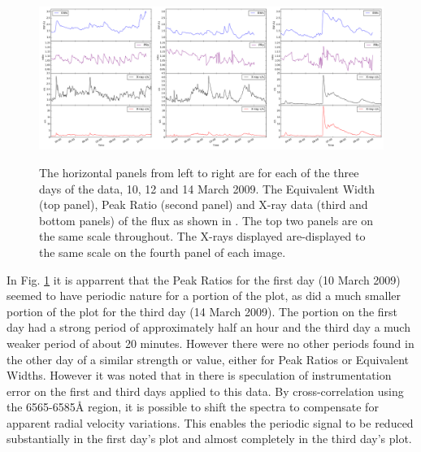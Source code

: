 \begin{figure}[!htbp]
\begin{center}
\includegraphics[scale=0.18]{Figures/uvrx-onepic.png} \\
\end{center}   
\caption{The horizontal panels from left to right are for each of the three days of the {\uves} data, 10, 12 and 14
  March 2009.  The Equivalent Width (top panel), Peak Ratio (second panel) and X-ray data (third and bottom panels) of the
  {\ha} flux as shown in \citet[Fig. 1 to Fig.3]{fuhrmeister11}. The top two panels are on the same scale
  throughout. The X-rays displayed are-displayed to the same scale on the fourth panel of each image.}
 \protect\label{fig:uvrxp1}
\end{figure}

In Fig. \ref{fig:uvrxp1} {\Firstp} it is apparrent that the Peak Ratios for the first day (10 March 2009) seemed to have
periodic nature for a portion of the plot, as did a much smaller portion of the plot for the third day (14 March
2009). The portion on the first day had a strong period of approximately half an hour and the third day a much weaker
period of about 20 minutes.  However there were no other periods found in the other day of a similar strength or value,
either for Peak Ratios or Equivalent Widths. However it was noted that in \citet[Section 4.1]{barnes14} there is
speculation of instrumentation error on the first and third days applied to this data. By cross-correlation using the
6565-6585{\AA} region, it is possible to shift the spectra to compensate for apparent radial velocity variations. This
enables the periodic signal to be reduced substantially in the first day's plot and almost completely in the third day's
plot.


